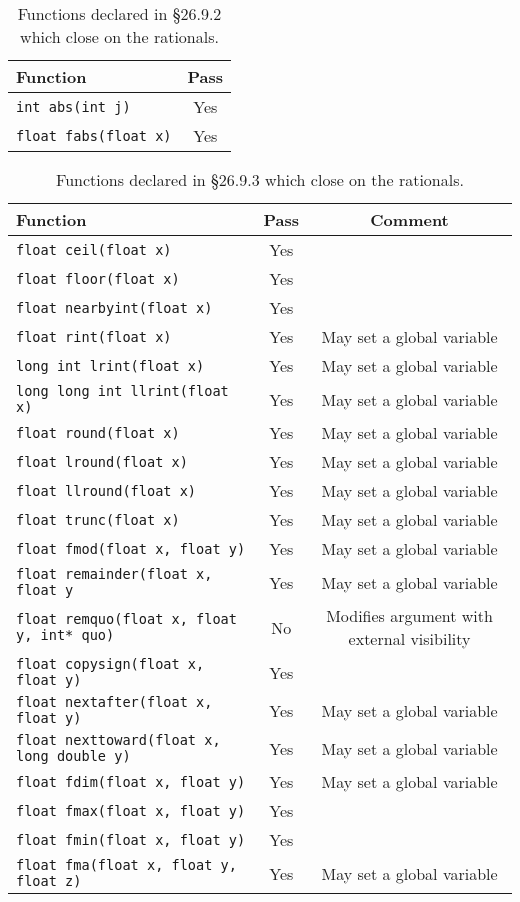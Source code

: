 \documentclass[prd,preprint,amsmath,amssymb,nofootinbib,eqsecnum]{revtex4-1}
\newcommand{\code}[1]{{\tt #1}}
\begin{document}
\begin{table}[h]
	\begin{tabular}{lc}
		Function & Pass
	\\
	\hline \hline
		\code{int abs(int j)} & Yes
	\\
	\hline
		\code{float fabs(float x)} & Yes
	\end{tabular}
\caption{Functions declared in \S 26.9.2 which close on the rationals.}
\label{tab:26.9.2}
\end{table}

\begin{table}[h]
	\begin{tabular}{lcc}
		Function & Pass & Comment
	\\
	\hline \hline
		\code{float ceil(float x)} &  Yes & 
	\\
	\hline
		\code{float floor(float x)} & Yes &
	\\
	\hline
		\code{float nearbyint(float x)} & Yes &
	\\
	\hline
		\code{float rint(float x)} & Yes & May set a global variable
	\\
	\hline
		\code{long int lrint(float x)} &  Yes & May set a global variable
	\\
	\hline
		\code{long long int llrint(float x)} & Yes & May set a global variable 
	\\
	\hline
		\code{float round(float x)} & Yes & May set a global variable
	\\
	\hline
		\code{float lround(float x)} & Yes & May set a global variable
	\\
	\hline
		\code{float llround(float x)} & Yes & May set a global variable
	\\
	\hline
		\code{float trunc(float x)} &  Yes & May set a global variable
	\\
	\hline
		\code{float fmod(float x, float y)} & Yes & May set a global variable
	\\
	\hline
		\code{float remainder(float x, float y} & Yes & May set a global variable
	\\
	\hline
		\code{float remquo(float x, float y, int* quo)} & No & Modifies argument with external visibility
	\\
	\hline
		\code{float copysign(float x, float y)} & Yes &
	\\
	\hline
		\code{float nextafter(float x, float y)} & Yes & May set a global variable
	\\
	\hline
		\code{float nexttoward(float x, long double y)} & Yes & May set a global variable
	\\
	\hline
		\code{float fdim(float x, float y)} & Yes & May set a global variable
	\\
	\hline
		\code{float fmax(float x, float y)} & Yes &
	\\
	\hline
		\code{float fmin(float x, float y)} & Yes &
	\\
	\hline
		\code{float fma(float x, float y, float z)} & Yes & May set a global variable
	\end{tabular}
\caption{Functions declared in \S 26.9.3 which close on the rationals.}
\label{tab:26.9.3}
\end{table}
\end{document}
